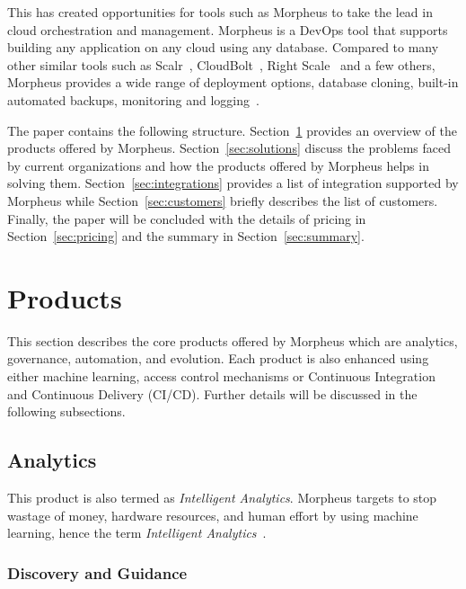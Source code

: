 This has created opportunities for tools such as Morpheus to take the lead in 
cloud orchestration and management. Morpheus is a DevOps tool that supports 
building any application on any cloud using any database. Compared to many 
other similar tools such as Scalr~\cite{hid-sp18-416-www-scalr}, 
CloudBolt~\cite{hid-sp18-416-www-cloudbolt}, Right 
Scale~\cite{hid-sp18-416-www-rightscale} and a few others, Morpheus provides a 
wide range of deployment options, database cloning, built-in automated backups, 
monitoring and 
logging~\cite{hid-sp18-416-www-cloud-management-tools-comparison}.

The paper contains the following structure. Section~\ref{sec:products} provides 
an overview of the products offered by Morpheus. Section~\ref{sec:solutions} 
discuss the problems faced by current organizations and how the products 
offered by Morpheus helps in solving them. Section~\ref{sec:integrations} 
provides a list of integration supported by Morpheus while 
Section~\ref{sec:customers} briefly describes the list of customers. Finally, 
the paper will be concluded with the details of pricing in 
Section~\ref{sec:pricing} and the summary in Section~\ref{sec:summary}.

\section{Products}
\label{sec:products}
This section describes the core products offered by Morpheus which are 
analytics, governance, automation, and evolution. Each product is also enhanced 
using either machine learning, access control mechanisms or Continuous 
Integration and Continuous Delivery (CI/CD). Further details will be discussed 
in the following subsections.

\subsection{Analytics}

This product is also termed as \textit{Intelligent Analytics}. Morpheus targets 
to stop wastage of money, hardware resources, and human effort by using machine 
learning, hence the term \textit{Intelligent 
Analytics}~\cite{hid-sp18-416-www-morpheus-product-guide}.  

\subsubsection{Discovery and Guidance}

